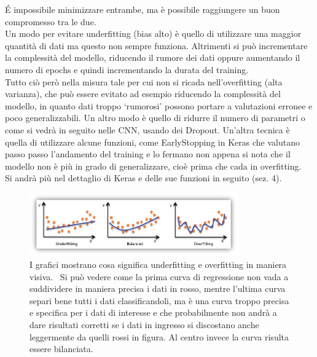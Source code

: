 É impossibile minimizzare entrambe, ma è possibile raggiungere un buon compromesso tra le due. \\

Un modo per evitare underfitting (bias alto) è quello di utilizzare una maggior quantità di 
dati ma questo non sempre funziona. Altrimenti si può incrementare la complessità del modello, 
riducendo il rumore dei dati oppure aumentando il numero di epochs e quindi incrementando la
 durata del training. \\
Tutto ciò però nella misura tale per cui non si ricada nell’overfitting (alta varianza), 
che può essere evitato ad esempio riducendo la complessità del modello, in quanto dati
 troppo ‘rumorosi’ possono portare a valutazioni erronee e poco generalizzabili. Un altro
  modo è quello di ridurre il numero di parametri o come si vedrà in seguito nelle CNN, usando dei Dropout.
   Un’altra tecnica è quella di utilizzare alcune funzioni, come EarlyStopping in Keras che
    valutano passo passo l’andamento del training e lo fermano non appena si nota che 
    il modello non è più in grado di generalizzare, cioè prima che cada in overfitting.\\
    Si andrà più nel dettaglio di Keras e delle sue funzioni in seguito (sez. 4).
   
    \begin{figure}[H]
      \centering
      \includegraphics[width=0.8\textwidth]{Figures/ofuf.PNG}
      \caption{\small{I grafici mostrano cosa significa underfitting e overfitting in maniera visiva.~\cite{ofuf} Si può vedere
       come la prima curva di regressione non vada a suddividere in maniera precisa i dati in rosso, mentre l'ultima curva separi bene tutti i dati classificandoli, ma è una curva troppo precisa e specifica per i dati di interesse e che probabilmente non andrà a dare risultati corretti se i dati in ingresso si discostano anche leggermente da quelli rossi in figura. Al centro invece la curva risulta essere bilanciata. 
      } %
      } %
      \label{fi:dcalc}
    \end{figure}
    
     

